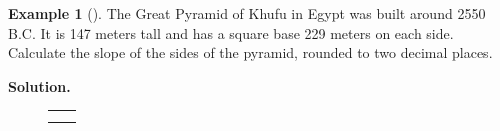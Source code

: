 \documentclass[10pt,]{book}
\theoremstyle{plain}
\theoremstyle{definition}
\theoremstyle{definition}
\newtheorem{example}[theorem]{Example}
\theoremstyle{definition}
\theoremstyle{definition}
\numberwithin{equation}{part}
\newlength{\panelmax}
\begin{document}
\begin{example}[]\label{example-Great-Pyramid}
The Great Pyramid of Khufu in Egypt was built around 2550 B.C. It is 147 meters tall and has a square base 229 meters on each side. Calculate the slope of the sides of the pyramid, rounded to two decimal places.%
\par\medskip\noindent%
\textbf{Solution.}\quad %
{%
\setlength{\panelmax}{0pt}
\newsavebox{\panelboxAZAp}
\newlength{\phAZAp}\setlength{\phAZAp}{\ht\panelboxAZAp+\dp\panelboxAZAp}
\settototalheight{\phAZAp}{\usebox{\panelboxAZAp}}
\setlength{\panelmax}{\maxof{\panelmax}{\phAZAp}}
\newsavebox{\panelboxDOimage}
\newlength{\phDOimage}\setlength{\phDOimage}{\ht\panelboxDOimage+\dp\panelboxDOimage}
\settototalheight{\phDOimage}{\usebox{\panelboxDOimage}}
\setlength{\panelmax}{\maxof{\panelmax}{\phDOimage}}
\leavevmode%
\setlength{\tabcolsep}{0\textwidth}
\begin{figure}
\begin{tabular}{@{}*{2}{c}@{}}
\begin{minipage}[c][\panelmax][t]{0.5\textwidth}\usebox{\panelboxAZAp}\end{minipage}&
\begin{minipage}[c][\panelmax][t]{0.5\textwidth}\usebox{\panelboxDOimage}\end{minipage}\tabularnewline
&
\parbox[t]{0.5\textwidth}{
}\end{tabular}
\end{figure}
}%
\end{example}
\end{document}
